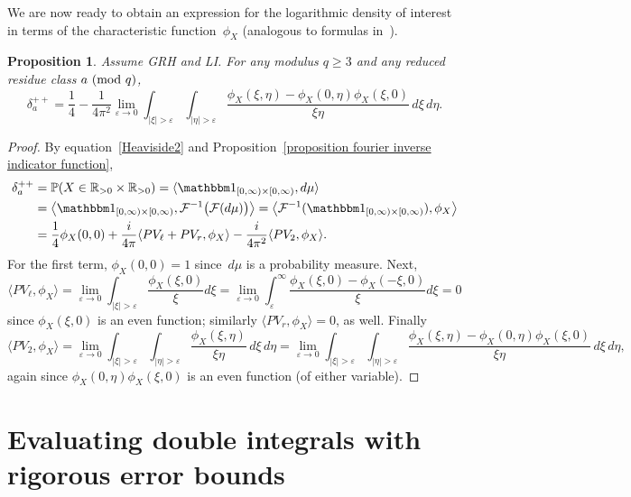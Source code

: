 \documentclass[11pt]{article}
\theoremstyle{plain}
\newtheorem{prop}[thm]{Proposition}
\theoremstyle{definition}
\numberwithin{equation}{section}
\renewcommand{\mod}[1]{{\ifmmode\text{\rm\ (mod~$#1$)}\else\discretionary{}{}{\hbox{\!\!}}\rm(mod~$#1$)\fi}}
\newcommand{\R}{\mathbb R}
\newcommand{\0}{{\vec 0}}
\begin{document}
We are now ready to obtain an expression for the logarithmic density of interest in terms of the characteristic function~$\phi_X$ (analogous to formulas in~\cite[end of Section~2D]{BSRPNR}).

\begin{prop} \label{density formula prop}
Assume GRH and LI. For any modulus $q\ge3$ and any reduced residue class $a\mod q$,
\[
\delta^{++}_a = \frac1{4}-\frac1{4\pi^2} \lim_{\varepsilon\rightarrow 0}\int_{|\xi|>\varepsilon} \int_{|\eta|>\varepsilon}\frac{\phi_X(\xi,\eta)-\phi_X(0,\eta)\phi_X(\xi,0)}{\xi\eta}\,d\xi\,d\eta.
\]
\end{prop}

\begin{proof}
By equation~\eqref{Heaviside2} and Proposition~\ref{proposition fourier inverse indicator function},
\begin{align*}
\delta^{++}_a &= \mathbb{P}(X\in \R_{>0}\times\R_{>0}) = \langle\mathbbm1_{[0,\infty)\times[0,\infty)},d\mu\rangle \\
&= \bigl\langle \mathbbm1_{[0,\infty)\times[0,\infty)}, \mathcal{F}^{-1}\bigl( \mathcal{F}(d\mu) \bigr) \bigr\rangle = \bigl\langle \mathcal{F}^{-1}(\mathbbm1_{[0,\infty)\times[0,\infty)}),\phi_X \bigr\rangle \\
&=\frac1{4}\phi_X(0,0)+\frac{i}{4\pi}\langle PV_\ell+PV_r,\phi_X\rangle-\frac{i}{4\pi^2}\langle PV_2,\phi_X\rangle.
\end{align*}
For the first term, $\phi_X(0,0)=1$ since~$d\mu$ is a probability measure. Next,
\[
\langle PV_\ell,\phi_X\rangle=\lim_{\varepsilon\rightarrow 0}\int_{|\xi|>\varepsilon}\frac{\phi_X(\xi,0)}{\xi}d\xi=\lim_{\varepsilon\rightarrow 0}\int_{\varepsilon}^\infty \frac{\phi_X(\xi,0)-\phi_X(-\xi,0)}{\xi}d\xi = 0
\]
since $\phi_X(\xi,0)$ is an even function; similarly $\langle PV_r,\phi_X\rangle = 0$, as well. Finally
\[
\langle PV_2,\phi_X\rangle=\lim_{\varepsilon\rightarrow 0}\int_{|\xi|>\varepsilon}\int_{|\eta|>\varepsilon}\frac{\phi_X(\xi,\eta)}{\xi\eta}\,d\xi\,d\eta=\lim_{\varepsilon\rightarrow 0}\int_{|\xi|>\varepsilon}\int_{|\eta|>\varepsilon}\frac{\phi_X(\xi,\eta)-\phi_X(0,\eta)\phi_X(\xi,0)}{\xi\eta}\,d\xi\,d\eta,
\]
again since $\phi_X(0,\eta)\phi_X(\xi,0)$ is an even function (of either variable).
\end{proof}


\section{Evaluating double integrals with rigorous error bounds} \label{general numeric section}
\end{document}
